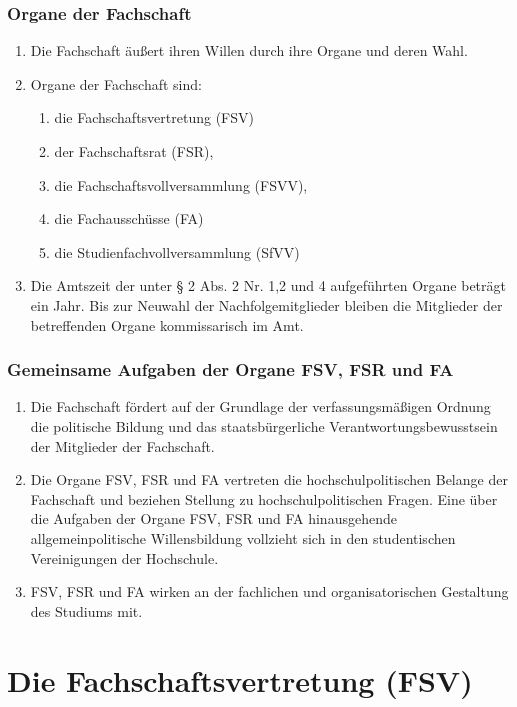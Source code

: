 \documentclass{article}
\providecommand{\tightlist}{\setlength{\itemsep}{0pt}\setlength{\parskip}{0pt}}
\begin{document}
\section{Organe der Fachschaft}\label{organe-der-fachschaft}

\begin{enumerate}[(1)]
	\item Die Fachschaft äußert ihren Willen durch ihre Organe und deren Wahl.
	\item Organe der Fachschaft sind:
	\begin{enumerate}[1.]
		\tightlist
		\item die Fachschaftsvertretung (FSV)
		\item der Fachschaftsrat (FSR),
		\item die Fachschaftsvollversammlung (FSVV),
		\item die Fachausschüsse (FA)
		\item die Studienfachvollversammlung (SfVV)
	\end{enumerate}
	\item Die Amtszeit der unter § 2 Abs. 2 Nr. 1,2 und 4 aufgeführten Organe beträgt ein Jahr. Bis zur Neuwahl der Nachfolgemitglieder bleiben die Mitglieder der betreffenden Organe kommissarisch im Amt.
\end{enumerate}

\section{Gemeinsame Aufgaben der Organe FSV, FSR und FA}\label{gemeinsame-aufgaben-der-organe-fsv-fsr-und-fa}

\begin{enumerate}[(1)]
	\item Die Fachschaft fördert auf der Grundlage der verfassungsmäßigen Ordnung die politische Bildung und das staatsbürgerliche Verantwortungsbewusstsein der Mitglieder der Fachschaft.
	\item Die Organe FSV, FSR und FA vertreten die hochschulpolitischen Belange der Fachschaft und beziehen Stellung zu hochschulpolitischen Fragen. Eine über die Aufgaben der Organe FSV, FSR und FA hinausgehende allgemeinpolitische Willensbildung vollzieht sich in den studentischen Vereinigungen der Hochschule.
	\item FSV, FSR und FA wirken an der fachlichen und organisatorischen Gestaltung des Studiums mit.
\end{enumerate}

\part{Die Fachschaftsvertretung (FSV)}\label{i.-die-fachschaftsvertretung-fsv}
\end{document}
